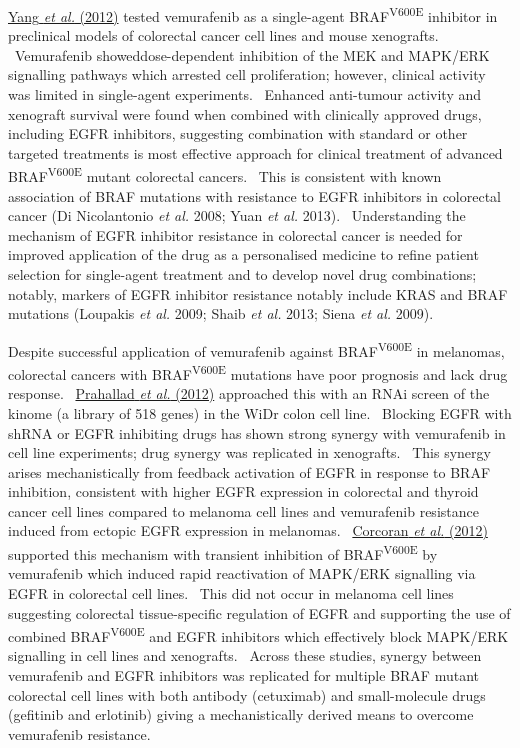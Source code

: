 \hyperlink{ENREF115}{Yang}\hyperlink{ENREF115}{\textit{ et al.}}\hyperlink{ENREF115}{ (2012)} tested vemurafenib as a single-agent BRAF\textsuperscript{V600E} inhibitor in preclinical models of colorectal cancer cell lines and mouse xenografts. \ Vemurafenib showeddose-dependent inhibition of the MEK and MAPK/ERK signalling pathways which arrested cell proliferation; however, clinical activity was limited in single-agent experiments. \ Enhanced anti-tumour activity and xenograft survival were found when combined with clinically approved drugs, including EGFR inhibitors, suggesting combination with standard or other targeted treatments is most effective approach for clinical treatment of advanced BRAF\textsuperscript{V600E} mutant colorectal cancers. \ This is consistent with known association of BRAF mutations with resistance to EGFR inhibitors in colorectal cancer (Di Nicolantonio\textit{ et al.} 2008; Yuan\textit{ et al.} 2013). \ Understanding the mechanism of EGFR inhibitor resistance in colorectal cancer is needed for improved application of the drug as a personalised medicine to refine patient selection for single-agent treatment and to develop novel drug combinations; notably, markers of EGFR inhibitor resistance notably include KRAS and BRAF mutations (Loupakis\textit{ et al.} 2009; Shaib\textit{ et al.} 2013; Siena\textit{ et al.} 2009). \  

Despite successful application of vemurafenib against BRAF\textsuperscript{V600E} in melanomas, colorectal cancers with BRAF\textsuperscript{V600E} mutations have poor prognosis and lack drug response. \ \hyperlink{ENREF80}{Prahallad}\hyperlink{ENREF80}{\textit{ et al.}}\hyperlink{ENREF80}{ (2012)} approached this with an RNAi screen of the kinome (a library of 518 genes) in the WiDr colon cell line. \ Blocking EGFR with shRNA or EGFR inhibiting drugs has shown strong synergy with vemurafenib in cell line experiments; drug synergy was replicated in xenografts. \ This synergy arises mechanistically from feedback activation of EGFR in response to BRAF inhibition, consistent with higher EGFR expression in colorectal and thyroid cancer cell lines compared to melanoma cell lines and vemurafenib resistance induced from ectopic EGFR expression in melanomas. \ \hyperlink{ENREF24}{Corcoran}\hyperlink{ENREF24}{\textit{ et al.}}\hyperlink{ENREF24}{ (2012)} supported this mechanism with transient inhibition of BRAF\textsuperscript{V600E} by vemurafenib which induced rapid reactivation of MAPK/ERK signalling via EGFR in colorectal cell lines. \ This did not occur in melanoma cell lines suggesting colorectal tissue-specific regulation of EGFR and supporting the use of combined BRAF\textsuperscript{V600E} and EGFR inhibitors which effectively block MAPK/ERK signalling in cell lines and xenografts. \ Across these studies, synergy between vemurafenib and EGFR inhibitors was replicated for multiple BRAF mutant colorectal cell lines with both antibody (cetuximab) and small-molecule drugs (gefitinib and erlotinib) giving a mechanistically derived means to overcome vemurafenib resistance. \  

